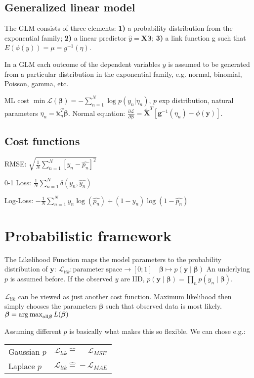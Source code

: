 \documentclass[10pt,a4paper,landscape]{article}
\renewcommand{\bf}[1]{\ensuremath{\mathbf{#1}}}
\newcommand{\bbeta}{\boldsymbol\beta}
\begin{document}
\begin{multicols*}{4}
\subsection{Generalized linear model}
The GLM consists of three elements: \textbf{1)} a probability distribution from the exponential family; \textbf{2)} a linear predictor $\hat y = \bf{X} \bbeta$; \textbf{3)} a link function g such that $E(\phi(y)) = \mu = g^{-1}(\eta)$.

In a GLM each outcome of the dependent variables $y$ is assumed to be generated from a particular distribution in the exponential family, e.g. normal, binomial, Poisson, gamma, etc.

ML cost $\min \mathcal{L}(\bbeta) = - \sum_{n=1}^N \log p(y_n | \eta_n)$, $p$ exp distribution, natural parameters $\eta_n = \tilde{\bf{x}}_n^T \bbeta$. Normal equation: $\frac{\partial \mathcal{L}}{\partial \bbeta} = \tilde{\bf{X}}^T [ \bf{g}^{-1}(\eta_n) - \phi(\bf{y})]$.


\subsection{Cost functions}
RMSE: $\sqrt{\frac{1}{N} \sum_{n=1}^{N}\left[y_n- \hat{p_n} \right]^2}$

0-1 Loss: $ \frac{1}{N} \sum_{n=1}^{N} \delta(y_n, \hat{y_n})$

Log-Loss: $- \frac{1}{N}  \sum_{n=1}^{N} y_n \log(\hat{p_n}) + (1-y_n) \log(1-\hat{p_n})$


\section{Probabilistic framework}
The Likelihood Function maps the model parameters to the probability distribution of $\bf{y}$:
$\mathcal{L}_{lik}\colon \text{parameter space} \to [0;1]\quad  \bbeta \mapsto p(\bf{y} \mid  \bbeta)$
An underlying $p$ is assumed before. If the observed $y$ are IID, $p(\bf{y} \mid \bbeta) = \prod_n p(y_n \mid \bbeta)$.

$\mathcal{L}_{lik}$ can be viewed as just another cost function. Maximum likelihood then simply chooses the parameters $\bbeta$ such that observed data is most likely. $\bbeta = \argmax_{\text{all} \bbeta} L(\bbeta)$

Assuming different $p$ is basically what makes this so flexible. We can chose e.g.:

\begin{tabular}{ l  l }
  \hline
  Gaussian $p$ & $\mathcal{L}_{lik} \widehat{=} -\mathcal{L}_{MSE}$ \\
  Laplace $p$  & $\mathcal{L}_{lik} \widehat{=} -\mathcal{L}_{MAE}$ \\
  \hline
\end{tabular}


\end{multicols*}
\end{document}
